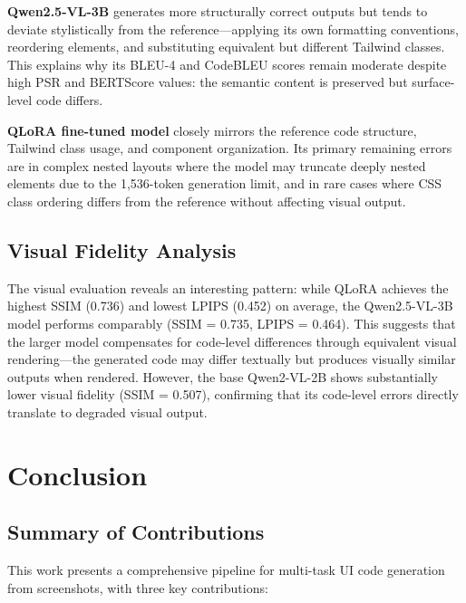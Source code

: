 \textbf{Qwen2.5-VL-3B} generates more structurally correct outputs but tends to deviate stylistically from the reference—applying its own formatting conventions, reordering elements, and substituting equivalent but different Tailwind classes. This explains why its BLEU-4 and CodeBLEU scores remain moderate despite high PSR and BERTScore values: the semantic content is preserved but surface-level code differs.

\textbf{QLoRA fine-tuned model} closely mirrors the reference code structure, Tailwind class usage, and component organization. Its primary remaining errors are in complex nested layouts where the model may truncate deeply nested elements due to the 1,536-token generation limit, and in rare cases where CSS class ordering differs from the reference without affecting visual output.

\subsection{Visual Fidelity Analysis}

The visual evaluation reveals an interesting pattern: while QLoRA achieves the highest SSIM (0.736) and lowest LPIPS (0.452) on average, the Qwen2.5-VL-3B model performs comparably (SSIM = 0.735, LPIPS = 0.464). This suggests that the larger model compensates for code-level differences through equivalent visual rendering—the generated code may differ textually but produces visually similar outputs when rendered. However, the base Qwen2-VL-2B shows substantially lower visual fidelity (SSIM = 0.507), confirming that its code-level errors directly translate to degraded visual output.


\section{Conclusion}

\subsection{Summary of Contributions}

This work presents a comprehensive pipeline for multi-task UI code generation from screenshots, with three key contributions:

